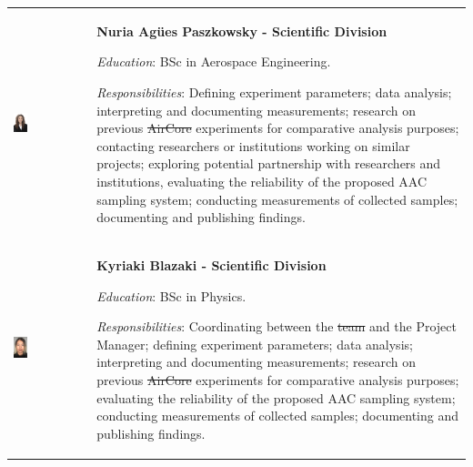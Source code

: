 \documentclass[a4paper,12pt,twoside]{article}
\providecommand{\DIFaddtex}[1]{{\protect\color{blue}\uwave{#1}}} %
\providecommand{\DIFdeltex}[1]{{\protect\color{red}\sout{#1}}}                      %
\providecommand{\DIFaddbegin}{} %
\providecommand{\DIFaddend}{} %
\providecommand{\DIFdelbegin}{} %
\providecommand{\DIFdelend}{} %
\providecommand{\DIFadd}[1]{\texorpdfstring{\DIFaddtex{#1}}{#1}} %
\providecommand{\DIFdel}[1]{\texorpdfstring{\DIFdeltex{#1}}{}} %
\newcommand{\DIFscaledelfig}{0.5}
\newlength{\DIFdelgraphicswidth} %
\newlength{\DIFdelgraphicsheight} %
\newcommand{\DIFaddincludegraphics}[2][]{{\color{blue}\fbox{\DIFOincludegraphics[#1]{#2}}}} %
\newcommand{\DIFdelincludegraphics}[2][]{%
\sbox{\DIFdelgraphicsbox}{\DIFOincludegraphics[#1]{#2}}%
\settoboxwidth{\DIFdelgraphicswidth}{\DIFdelgraphicsbox} %
\settoboxtotalheight{\DIFdelgraphicsheight}{\DIFdelgraphicsbox} %
\scalebox{\DIFscaledelfig}{%
\parbox[b]{\DIFdelgraphicswidth}{\usebox{\DIFdelgraphicsbox}\\[-\baselineskip] \rule{\DIFdelgraphicswidth}{0em}}\llap{\resizebox{\DIFdelgraphicswidth}{\DIFdelgraphicsheight}{%
\setlength{\unitlength}{\DIFdelgraphicswidth}%
\begin{picture}(1,1)%
\thicklines\linethickness{2pt} %
{\color[rgb]{1,0,0}\put(0,0){\framebox(1,1){}}}%
{\color[rgb]{1,0,0}\put(0,0){\line( 1,1){1}}}%
{\color[rgb]{1,0,0}\put(0,1){\line(1,-1){1}}}%
\end{picture}%
}\hspace*{3pt}}} %
} %
\DeclareRobustCommand{\DIFaddbegin}{\DIFOaddbegin \let\includegraphics\DIFaddincludegraphics} %
\DeclareRobustCommand{\DIFaddend}{\DIFOaddend \let\includegraphics\DIFOincludegraphics} %
\DeclareRobustCommand{\DIFdelbegin}{\DIFOdelbegin \let\includegraphics\DIFdelincludegraphics} %
\DeclareRobustCommand{\DIFdelend}{\DIFOaddend \let\includegraphics\DIFOincludegraphics} %
\begin{document}
\begin{longtable}[]{m{} m{}}
\DIFaddend \includegraphics[width=0.2\textwidth]{1-introduction/img/agues-paszkowsky.jpg} & \textbf{Nuria Agües Paszkowsky - Scientific Division}

\smallskip
\textit{Education}: BSc in Aerospace Engineering.

\smallskip
\textit{Responsibilities}: Defining experiment parameters; data analysis; interpreting and documenting measurements; research on previous \DIFdelbegin \DIFdel{AirCore }\DIFdelend \DIFaddbegin \DIFadd{CAC }\DIFaddend experiments for comparative analysis purposes; contacting researchers or institutions working on similar projects; exploring potential partnership with researchers and institutions, evaluating the reliability of the proposed AAC sampling system; conducting measurements of collected samples; documenting and publishing findings. 
\bigskip
\\

\includegraphics[width=0.2\textwidth]{1-introduction/img/kiki-blazaki.jpg} & \textbf{Kyriaki Blazaki - Scientific Division}

\smallskip
\textit{Education}: BSc in Physics.


\smallskip
\textit{Responsibilities}: Coordinating between the \DIFdelbegin \DIFdel{team }\DIFdelend \DIFaddbegin \DIFadd{Scientific Division }\DIFaddend and the Project Manager; defining experiment parameters; data analysis; interpreting and documenting measurements; research on previous \DIFdelbegin \DIFdel{AirCore }\DIFdelend \DIFaddbegin \DIFadd{CAC }\DIFaddend experiments for comparative analysis purposes; evaluating the reliability of the proposed AAC sampling system; conducting measurements of collected samples; documenting and publishing findings. 
\bigskip
\\


\end{longtable}
\end{document}
